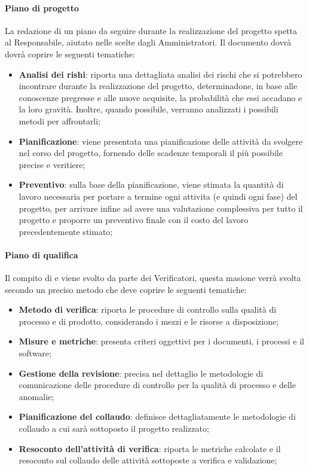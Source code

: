 \paragraph{Piano di progetto}\Spazio
La redazione di un piano da seguire durante la realizzazione del progetto spetta al Responsabile, aiutato nelle scelte dagli Amministratori. Il documento dovrà dovrà coprire le seguenti tematiche:
 \begin{itemize}
 	\item\textbf{{Analisi dei rishi}}: riporta una dettagliata analisi dei rischi che si potrebbero incontrare durante la realizzazione del progetto, determinadone, in base alle conoscenze pregresse e alle nuove acquisite, la probabilità che essi accadano e la loro gravità. Inoltre, quando possibile, verranno analizzati i possibili metodi per affrontarli;
 	\item\textbf{{Pianificazione}}: viene presentata una pianificazione delle attività da svolgere nel corso del progetto, fornendo delle scadenze temporali il più possibile precise e veritiere;
 	\item\textbf{{Preventivo}}: sulla base della pianificazione, viene stimata la quantità di lavoro necessaria per portare a termine ogni attivita (e quindi ogni fase) del progetto, per arrivare infine ad avere una valutazione complessiva per tutto il progetto e proporre un preventivo finale con il costo del lavoro precedentemente stimato; 		
 \end{itemize}
\paragraph{Piano di qualifica}\Spazio
Il compito di  e  viene svolto da parte dei Verificatori, questa masione verrà svolta secondo un preciso metodo che deve coprire le seguenti tematiche:
\begin{itemize}
	\item\textbf{{Metodo di verifica}}: riporta le procedure di controllo sulla qualità di processo e di prodotto, considerando i mezzi e le risorse a disposizione; 	
	\item\textbf{{Misure e metriche}}: presenta criteri oggettivi per i documenti, i processi e il software; 	
	\item\textbf{{Gestione della revisione}}: precisa nel dettaglio le metodologie di comunicazione delle procedure di controllo per la qualità di processo e delle anomalie; 	
	\item\textbf{{Pianificazione del collaudo}}: definisce dettagliatamente le metodologie di collaudo a cui sarà sottoposto il progetto realizzato; 	
	\item\textbf{{Resoconto dell'attività di verifica}}: riporta le metriche calcolate e il resoconto sul collaudo delle attività sottoposte a verifica e validazione; 			
\end{itemize}
